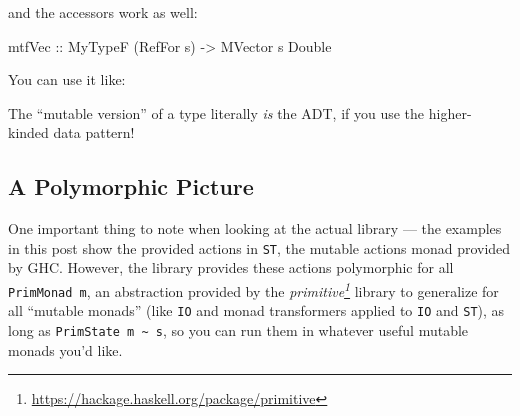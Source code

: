 \documentclass[]{article}
\newenvironment{Shaded}{}{}
\newcommand{\CommentTok}[1]{\textcolor[rgb]{0.38,0.63,0.69}{\textit{#1}}}
\newcommand{\DataTypeTok}[1]{\textcolor[rgb]{0.56,0.13,0.00}{#1}}
\newcommand{\DecValTok}[1]{\textcolor[rgb]{0.25,0.63,0.44}{#1}}
\newcommand{\FloatTok}[1]{\textcolor[rgb]{0.25,0.63,0.44}{#1}}
\newcommand{\KeywordTok}[1]{\textcolor[rgb]{0.00,0.44,0.13}{\textbf{#1}}}
\newcommand{\NormalTok}[1]{#1}
\newcommand{\OperatorTok}[1]{\textcolor[rgb]{0.40,0.40,0.40}{#1}}
\newcommand{\OtherTok}[1]{\textcolor[rgb]{0.00,0.44,0.13}{#1}}
\renewcommand{\href}[2]{#2\footnote{\url{#1}}}
\begin{document}
and the accessors work as well:

\begin{Shaded}
\begin{Highlighting}[]
\NormalTok{mtfVec}
\OtherTok{    ::} \DataTypeTok{MyTypeF}\NormalTok{ (}\DataTypeTok{RefFor}\NormalTok{ s)}
    \OtherTok{{-}>} \DataTypeTok{MVector}\NormalTok{ s }\DataTypeTok{Double}
\end{Highlighting}
\end{Shaded}

You can use it like:

\begin{Shaded}
\end{Shaded}

The ``mutable version'' of a type literally \emph{is} the ADT, if you use the
higher-kinded data pattern!

\hypertarget{a-polymorphic-picture}{%
\subsection{A Polymorphic Picture}\label{a-polymorphic-picture}}

One important thing to note when looking at the actual library --- the examples
in this post show the provided actions in \texttt{ST}, the mutable actions monad
provided by GHC. However, the library provides these actions polymorphic for all
\texttt{PrimMonad\ m}, an abstraction provided by the
\emph{\href{https://hackage.haskell.org/package/primitive}{primitive}} library
to generalize for all ``mutable monads'' (like \texttt{IO} and monad
transformers applied to \texttt{IO} and \texttt{ST}), as long as
\texttt{PrimState\ m\ \textasciitilde{}\ s}, so you can run them in whatever
useful mutable monads you'd like.
\end{document}
